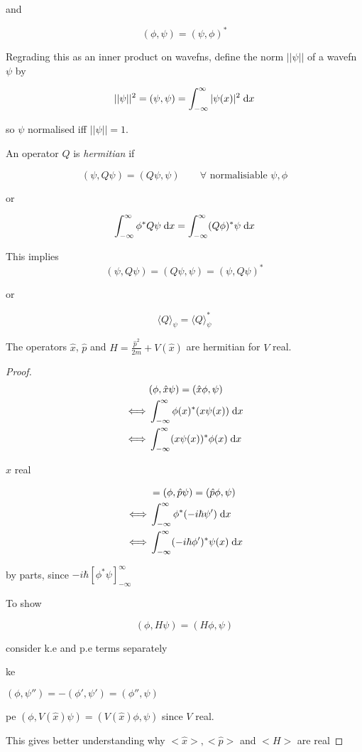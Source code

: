 \documentclass[a4paper]{article}
\begin{document}
and

\[ (\phi,\psi) = (\psi,\phi)^{*} \]

Regrading this as an inner product on wavefns, define the norm $ | | \psi | | $ of a wavefn $ \psi $ by

\[ | | \psi | |^{2} = (\psi,\psi) = \int_{-\infty}^{\infty} | \psi(x) |^{2} \; \mathrm{d} x \]

so $ \psi $ normalised iff $ | | \psi | | =1 $.

An operator $ Q $ is \emph{hermitian} if

\[ (\psi, Q \psi) = (Q \psi, \psi) \qquad \forall \text{ normalisiable } \psi, \phi \]

or 

\[ \int_{-\infty}^{\infty} \phi^{*} Q \psi \; \mathrm{d} x = \int_{-\infty}^{\infty} (Q \phi)^{*} \psi \; \mathrm{d} x \]

This implies 
\[ (\psi, Q \psi) = (Q \psi, \psi) = (\psi, Q \psi)^{*} \]

or

\[ \langle Q \rangle_{\psi} =  \langle Q \rangle_{\psi}^{*}\]

The operators $ \hat{x} $, $ \hat{p} $ and $ H  = \frac{\hat{p}^{2}}{2m} + V(\hat{x}) $ are hermitian for $ V $ real.

\begin{proof}
	\begin{align*}
	& (\phi, \hat{x} \psi ) = (\hat{x}\phi, \psi ) \\
	\iff &   \int_{-\infty}^{\infty} \phi(x)^{*} (x \psi(x)) \; \mathrm{d} x \\
	\iff &  \int_{-\infty}^{\infty} (x \psi(x))^{*} \phi(x) \; \mathrm{d} x
	\end{align*}
	
	$ x $ real
	
	
	\begin{align*}
	& = (\phi, \hat{p} \psi ) = (\hat{p}\phi, \psi ) \\\iff &   \int_{-\infty}^{\infty} \phi^{*} (-i \hbar \psi') \; \mathrm{d} x \\
	\iff &  \int_{-\infty}^{\infty} (-i\hbar \phi')^{*} \psi(x) \; \mathrm{d} x
	\end{align*}
	
	by parts, since $  - i \hbar \left[  \phi^{*} \psi \right]_{-\infty}^{\infty}  $
	
	To show 
	
	\[ (\phi, H \psi) = (H \phi,\psi) \]
	
	consider k.e and p.e terms separately
	
	ke
	
	$ (\phi, \psi'') = - (\phi',\psi') = (\phi'',\psi) $
	
	pe
	$ (\phi,V(\hat{x})\psi  )  = (V(\hat{x})\phi, \psi )  $ since $ V $ real.
	
	This gives better understanding why $ <\hat{x}>, <\hat{p}> $ and $ <H>$ are real	
\end{proof}
	
\end{document}
